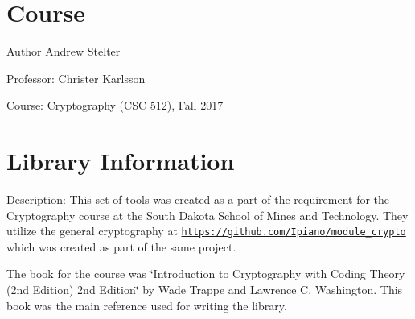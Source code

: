 \hypertarget{index_course_section}{}\section{Course}\label{index_course_section}
\begin{DoxyAuthor}{Author}
Andrew Stelter
\end{DoxyAuthor}
\begin{DoxyParagraph}{Professor\+: }
Christer Karlsson
\end{DoxyParagraph}
\begin{DoxyParagraph}{Course\+: }
Cryptography (C\+SC 512), Fall 2017
\end{DoxyParagraph}
\hypertarget{index_program_section}{}\section{Library Information}\label{index_program_section}
Description\+: This set of tools was created as a part of the requirement for the Cryptography course at the South Dakota School of Mines and Technology. They utilize the general cryptography at \href{https://github.com/Ipiano/module_crypto}{\tt https\+://github.\+com/\+Ipiano/module\+\_\+crypto} which was created as part of the same project.

The book for the course was \char`\"{}\+Introduction to Cryptography with Coding Theory (2nd Edition) 2nd Edition\char`\"{} by Wade Trappe and Lawrence C. Washington. This book was the main reference used for writing the library.

